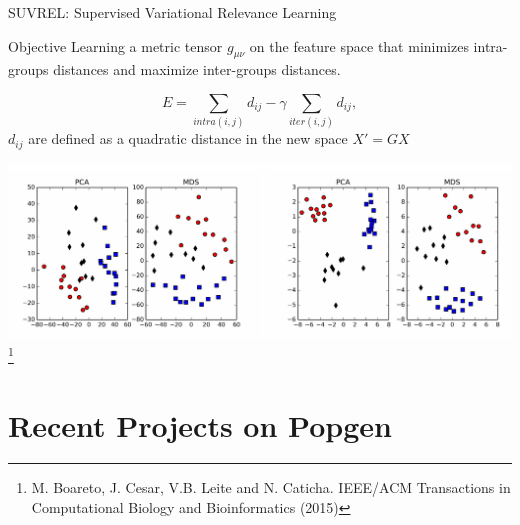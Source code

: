 \documentclass[10pt]{beamer}
\begin{document}
\begin{frame}{SUVREL: Supervised Variational Relevance Learning}

  \begin{alertblock}{Objective}
  Learning a metric tensor $g_{\mu\nu}$ on the feature space that minimizes
  intra-groups distances and maximize inter-groups distances. 
	\end{alertblock}
  \[
    E = \sum_{intra(i,j)} d_{ij} - \gamma \sum_{iter(i,j)} d_{ij}, 
  \]
  $d_{ij}$ are defined as a quadratic distance in the new space $X' = G X$ 

  \includegraphics[width=\textwidth]{./Figures/suvrel_image.png}
  \let\thefootnote\relax\footnote{M. Boareto, J. Cesar, V.B. Leite and
    N. Caticha. IEEE/ACM Transactions in Computational Biology and
    Bioinformatics (2015)}
\end{frame}

\section{Recent Projects on Popgen}
\end{document}
